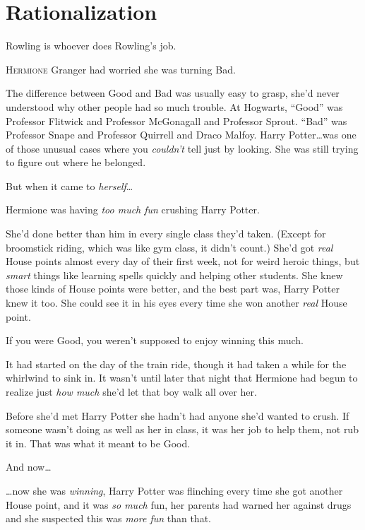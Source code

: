 \chapter{Rationalization}

\begin{chapterOpeningAuthorNote}
Rowling is whoever does Rowling’s job.
\end{chapterOpeningAuthorNote}

\lettrine{H}{ermione} Granger had worried she was turning Bad.

\hplettrineextrapara
The difference between Good and Bad was usually easy to grasp, she’d never understood why other people had so much trouble. At Hogwarts, “Good” was Professor Flitwick and Professor McGonagall and Professor Sprout. “Bad” was Professor Snape and Professor Quirrell and Draco Malfoy. Harry Potter…was one of those unusual cases where you \emph{couldn’t} tell just by looking. She was still trying to figure out where he belonged.

But when it came to \emph{herself}…

Hermione was having \emph{too much fun} crushing Harry Potter.

She’d done better than him in every single class they’d taken. (Except for broomstick riding, which was like gym class, it didn’t count.) She’d got \emph{real} House points almost every day of their first week, not for weird heroic things, but \emph{smart} things like learning spells quickly and helping other students. She knew those kinds of House points were better, and the best part was, Harry Potter knew it too. She could see it in his eyes every time she won another \emph{real} House point.

If you were Good, you weren’t supposed to enjoy winning this much.

It had started on the day of the train ride, though it had taken a while for the whirlwind to sink in. It wasn’t until later that night that Hermione had begun to realize just \emph{how much} she’d let that boy walk all over her.

Before she’d met Harry Potter she hadn’t had anyone she’d wanted to crush. If someone wasn’t doing as well as her in class, it was her job to help them, not rub it in. That was what it meant to be Good.

And now…

…now she was \emph{winning}, Harry Potter was flinching every time she got another House point, and it was \emph{so much} fun, her parents had warned her against drugs and she suspected this was \emph{more fun} than that.

